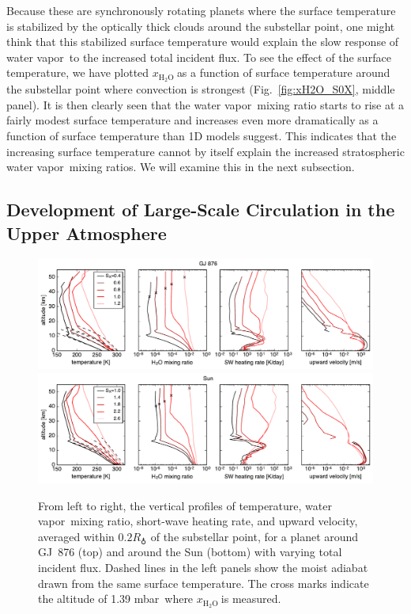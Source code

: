 \documentclass[11pt,numberedappendix,twocolappendix,]{emulateapj}
\def\water{H$_2$O }
\def\xwater{$x_\text{\water}$}
\def\preslevel{1.39 mbar\ }
\newcommand{\wv}{{\color{orange}water vapor\ }}
\begin{document}
Because these are synchronously rotating planets where the surface temperature is stabilized by the optically thick clouds around the substellar point, one might think that this stabilized surface temperature would explain the slow  response of \wv to the increased total incident flux. 
To see the effect of the surface temperature, we have plotted \xwater as a function of surface temperature around the substellar point where convection is strongest (Fig.~\ref{fig:xH2O_S0X}, middle panel). 
It is then clearly seen that the \wv mixing ratio starts to rise at a fairly modest surface temperature and increases even more dramatically as a function of surface temperature than 1D models suggest. 
This indicates that the increasing surface temperature cannot by itself explain the increased stratospheric \wv mixing ratios. 
We will examine this in the next subsection. 

\subsection{Development of Large-Scale Circulation in the Upper Atmosphere}
\label{ss:result_omega}


\begin{figure}[htb]
    \begin{center}
    \includegraphics[width=1\hsize]{fig/AqOH0TLS_GJ876_temp_xH2O_vz_heat.pdf}
    \includegraphics[width=1\hsize]{fig/AqOH0TLS_Sun_temp_xH2O_vz_heat.pdf}
    \end{center}
\caption{From left to right, the vertical profiles of temperature, \wv mixing ratio, short-wave heating rate, and upward velocity, averaged within $0.2R_\earth$ of the substellar point, for a planet around GJ~876 (top) and around the Sun (bottom) with varying total incident flux. Dashed lines in the left panels show the moist adiabat drawn from the same surface temperature. The cross marks indicate the altitude of \preslevel where \xwater is measured. }
\label{fig:AqOH0TLS_GJ876_temp_xH2O_vz_heat}
\end{figure}
\end{document}
